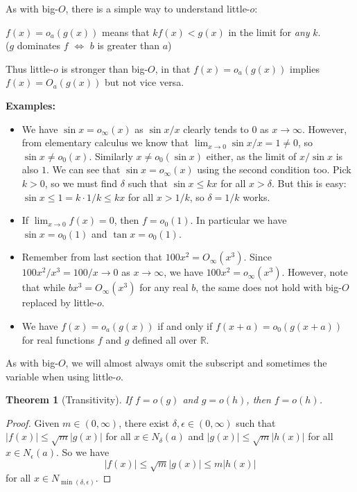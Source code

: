 \documentclass{article}
\newtheorem{theorem}{Theorem}
\theoremstyle{definition}
\newcommand\RR{\mathbb R}
\newcommand\abs[1]{\left\lvert#1\right\rvert}
\begin{document}
As with big-$O$, there is a simple way to understand little-$o$:
\begin{center}
    \(f(x) = o_a(g(x))\) means that \(kf(x) < g(x)\) in the limit for \textit{any} \(k\). \\
    (\(g\) dominates \(f\) \(\iff\) \(b\) is greater than \(a\))
\end{center}
Thus little-$o$ is stronger than big-$O$, in that \(f(x) = o_a(g(x))\) implies \(f(x) = O_a(g(x))\) but not vice versa.

\textbf{Examples:}

\begin{itemize}
    \item We have \(\sin x = o_{\infty}(x)\) as \(\sin x / x\) clearly tends to \(0\) as \(x\to\infty\).
        However, from elementary calculus we know that \(\lim_{x\to 0} \sin x/x = 1 \ne 0\), so \(\sin x \ne o_0(x)\).
        Similarly \(x \ne o_0(\sin x)\) either, as the limit of \(x/\sin x\) is also \(1\).
        We can see that \(\sin x = o_{\infty}(x)\) using the second condition too.
        Pick \(k > 0\), so we must find \(\delta\) such that \(\sin x \le kx\) for all \(x>\delta\).
        But this is easy: \(\sin x \le 1 = k \cdot 1/k \le kx\) for all \(x>1/k\), so \(\delta = 1/k\) works.

    \item If \(\lim_{x\to 0} f(x) = 0\), then \(f = o_0(1)\).
        In particular we have \(\sin x = o_0(1)\) and \(\tan x = o_0(1)\).

    \item Remember from last section that \(100x^2 = O_{\infty}(x^3)\).
        Since \(100x^2/x^3 = 100/x \to 0\) as \(x\to\infty\), we have \(100x^2 = o_{\infty}(x^3)\).
        However, note that while \(bx^3 = O_{\infty}(x^3)\) for any real \(b\), the same does not hold with big-$O$ replaced by little-$o$.

    \item We have \(f(x) = o_a(g(x))\) if and only if \(f(x+a) = o_0(g(x+a))\) for real functions \(f\) and \(g\) defined all over \(\RR\).
\end{itemize}

As with big-$O$, we will almost always omit the subscript and sometimes the variable when using little-$o$.

\begin{theorem}[Transitivity]
    If \(f = o(g)\) and \(g = o(h)\), then \(f = o(h)\).
\end{theorem}

\begin{proof}
    Given \(m\in(0,\infty)\), there exist \(\delta,\epsilon\in(0,\infty)\) such that \(\abs{f(x)}\le\sqrt m \abs{g(x)}\) for all \(x\in N_{\delta}(a)\) and \(\abs{g(x)}\le\sqrt m \abs{h(x)}\) for all \(x\in N_{\epsilon}(a)\).
    So we have
    \[\abs{f(x)} \le \sqrt m \abs{g(x)} \le m \abs{h(x)}\]
    for all \(x\in N_{\min(\delta,\epsilon)}\).
\end{proof}
\end{document}
